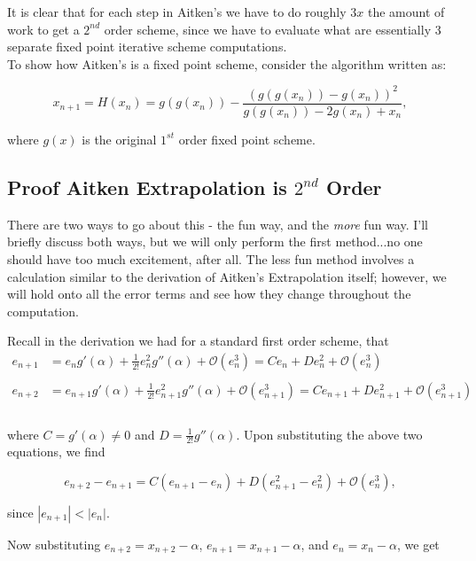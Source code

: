 \documentclass[paper=a4, fontsize=11pt]{scrartcl} %
\numberwithin{equation}{section} %
\numberwithin{figure}{section} %
\numberwithin{table}{section} %
\begin{document}
It is clear that for each step in Aitken's we have to do roughly $3x$ the amount of work to get a $2^{nd}$ order scheme, since we have to evaluate what are essentially 3 separate fixed point iterative scheme computations. \\

To show how Aitken's is a fixed point scheme, consider the algorithm written as:

$$x_{n+1} = H(x_n) = g(g(x_n)) - \frac{ ( g(g(x_n)) - g(x_n) )^2   }{ g(g(x_n)) - 2 g(x_n) + x_n   },$$

where $g(x)$ is the original $1^{st}$ order fixed point scheme.


%
%
%
%
\subsection{Proof Aitken Extrapolation is $2^{nd}$ Order}

There are two ways to go about this - the fun way, and the \emph{more} fun way. I'll briefly discuss both ways, but we will only perform the first method...no one should have too much excitement, after all. The less fun method involves a calculation similar to the derivation of Aitken's Extrapolation itself; however, we will hold onto all the error terms and see how they change throughout the computation.

Recall in the derivation we had for a standard first order scheme, that
\begin{align} 
e_{n+1}&= e_n g'(\alpha) + \frac{1}{2!} e_n^2 g''(\alpha) + \mathcal{O}(e_n^3) = C e_n  + D e_n^2 + \mathcal{O}(e_n^3)  \\ \\
\label{aitken_proof1}
e_{n+2}&= e_{n+1} g'(\alpha) +  \frac{1}{2!} e_{n+1}^2 g''(\alpha) + \mathcal{O}(e_{n+1}^3) = C e_{n+1}  + D e_{n+1}^2 + \mathcal{O}(e_{n+1}^3) \\
\end{align}\\

where $C=g'(\alpha)\neq 0$ and $D= \frac{1}{2!} g''(\alpha).$ Upon substituting the above two equations, we find

$$e_{n+2}-e_{n+1} = C(e_{n+1}-e_n) + D( e_{n+1}^2 - e_n^2 ) +  \mathcal{O}(e_{n}^3),$$

since $\left|e_{n+1}\right| <  \left|e_{n}\right|.$

Now substituting $e_{n+2}=x_{n+2}-\alpha$, $e_{n+1}=x_{n+1}-\alpha$, and $e_n=x_n-\alpha$, we get
\end{document}
